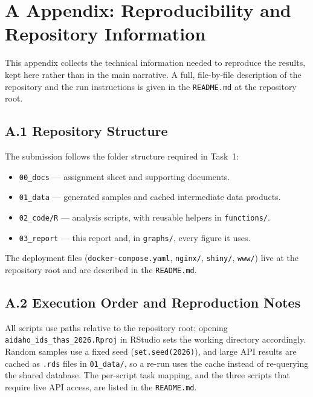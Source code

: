 \documentclass[10pt,a4paper]{article}
\begin{document}

\section*{A Appendix: Reproducibility and Repository Information}

\label{app:repro}

This appendix collects the technical information needed to reproduce the results,
kept here rather than in the main narrative. A full, file-by-file description of
the repository and the run instructions is given in the \texttt{README.md} at the
repository root.

\subsection*{A.1 Repository Structure}

The submission follows the folder structure required in Task~1:
\begin{itemize}
    \item \texttt{00\_docs} --- assignment sheet and supporting documents.
    \item \texttt{01\_data} --- generated samples and cached intermediate data
          products.
    \item \texttt{02\_code/R} --- analysis scripts, with reusable helpers in
          \texttt{functions/}.
    \item \texttt{03\_report} --- this report and, in \texttt{graphs/}, every
          figure it uses.
\end{itemize}
The deployment files (\texttt{docker-compose.yaml}, \texttt{nginx/},
\texttt{shiny/}, \texttt{www/}) live at the repository root and are described in
the \texttt{README.md}.

\subsection*{A.2 Execution Order and Reproduction Notes}

All scripts use paths relative to the repository root; opening
\texttt{aidaho\_ids\_thas\_2026.Rproj} in RStudio sets the working directory
accordingly. Random samples use a fixed seed (\texttt{set.seed(2026)}), and large
API results are cached as \texttt{.rds} files in \texttt{01\_data/}, so a re-run
uses the cache instead of re-querying the shared database. The per-script task
mapping, and the three scripts that require live API access, are listed in the
\texttt{README.md}.
\end{document}
